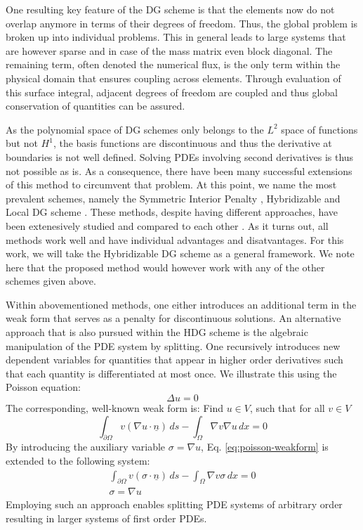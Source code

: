 \documentclass[sn-mathphys,Numbered]{sn-jnl}%
\theoremstyle{thmstyleone}%
\theoremstyle{thmstyletwo}%
\theoremstyle{thmstylethree}%
\begin{document}
One resulting key feature of the DG scheme is that the elements now do not overlap anymore in terms of their degrees of freedom.
Thus, the global problem is broken up into individual problems.
This in general leads to large systems that are however sparse and in case of the mass matrix even block diagonal.
The remaining term, often denoted the numerical flux, is the only term within the physical domain that ensures coupling across elements.
Through evaluation of this surface integral, adjacent degrees of freedom are coupled and thus global conservation of quantities can be assured.

As the polynomial space of DG schemes only belongs to the $L^2$ space of functions but not $H^1$, the basis functions are discontinuous and thus the derivative at boundaries is not well defined. 
Solving PDEs involving second derivatives is thus not possible as is.
As a consequence, there have been many successful extensions of this method to circumvent that problem. At this point, we name the most prevalent schemes, namely the Symmetric Interior Penalty \cite{epshteynSymmetricInteriorPenalty}, Hybridizable \cite{warburtonDiscontinuousGalerkinMethod1999} and Local DG scheme \cite{cockburnLocalDiscontinuousGalerkin1998}.
These methods, despite having different approaches, have been extenesively studied and compared to each other \cite{arnoldUnifiedAnalysisDiscontinuous2002}.
As it turns out, all methods work well and have individual advantages and disatvantages.
For this work, we will take the Hybridizable DG scheme as a general framework.
We note here that the proposed method would however work with any of the other schemes given above.

Within abovementioned methods, one either introduces an additional term in the weak form that serves as a penalty for discontinuous solutions.
An alternative approach that is also pursued within the HDG scheme is the algebraic manipulation of the PDE system by splitting.
One recursively introduces new dependent variables for quantities that appear in higher order derivatives such that each quantity is differentiated at most once.
We illustrate this using the Poisson equation:
\begin{equation}
    \Delta u = 0
\end{equation}
The corresponding, well-known weak form is: Find $u \in V$, such that for all $v \in V$
\begin{equation}\label{eq:poisson-weakform}
    \int_{\partial\Omega} v (\nabla u \cdot \underline{n}) \,ds - \int_\Omega \nabla v \nabla u \,dx = 0
\end{equation}
By introducing the auxiliary variable $\sigma = \nabla u$, Eq. \ref{eq:poisson-weakform} is extended to the following system:
\begin{align}
    \int_{\partial\Omega} v (\sigma \cdot \underline{n}) \,ds - \int_\Omega \nabla v \sigma \,dx = 0 \\
    \sigma = \nabla u
\end{align}
Employing such an approach enables splitting PDE systems of arbitrary order resulting in larger systems of first order PDEs.
\end{document}
